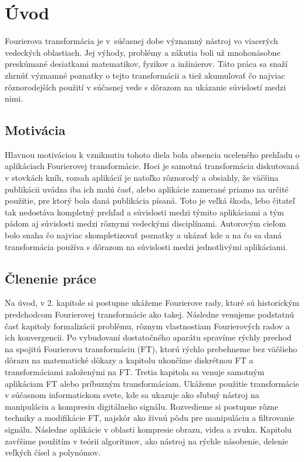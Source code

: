 \chapter{Úvod}

Fourierova transformácia je v~súčasnej dobe významný nástroj vo
viacerých vedeckých oblastiach. Jej výhody, problémy a zákutia boli už
mnohonásobne preskúmané desiatkami matematikov, fyzikov a inžinierov.
Táto práca sa snaží zhrnúť významné poznatky o tejto transformácii a
tiež akumulovať čo najviac rôznorodejších použití v súčasnej vede
s dôrazom na ukázanie súvislostí medzi nimi.

\section{Motivácia}
Hlavnou motiváciou k vzniknutiu tohoto diela bola absencia uceleného
prehľadu o aplikáciach Fourierovej transformácie. Hoci je samotná
transformácia diskutovaná v stovkách kníh, rozsah aplikácií je natoľko
rôznorodý a obsiahly, že väčšina publikácii uvádza iba ich malú časť,
alebo aplikácie zamerané priamo na určité použitie, pre ktorý bola daná
publikácia písaná. Toto je veľká škoda, lebo čitateľ tak nedostáva
kompletný prehľad a súvislosti medzi týmito aplikáciami a tým
pádom aj súvislosti medzi rôznymi vedeckými disciplínami. Autorovým
cieľom bolo snaha čo najviac skompletizovať poznatky a ukázať kde a
na čo sa daná transformácia používa s dôrazom na súvislosti medzi
jednotlivými aplikáciami.

\section{Členenie práce}
Na úvod, v 2. kapitole si postupne ukážeme Fourierove rady, ktoré sú
historickým predchodcom Fourierovej transformácie ako takej. Následne
venujeme podstatnú časť kapitoly formalizácii problému, rôznym
vlastnostiam Fourierových radov a ich konvergencii. Po vybudovaní
dostatočného aparátu spravíme rýchly prechod na spojitú Fourierovu
transformáciu (FT), ktorú rýchlo prebehneme bez väčšieho dôrazu na
matematické dôkazy a kapitolu ukončíme diskrétnou FT a 
transformáciami založenými na FT.
Tretia kapitola sa venuje samotným aplikáciam FT alebo príbuzným
transformáciam.  Ukážeme použitie %
transformácie v súčasnom informatickom svete, kde sa ukazuje ako
sľubný nástroj na manipuláciu a kompresiu digitálneho signálu.
Rozvedieme si postupne rôzne techniky a modifikácie FT, najskôr ako
živnú pôdu pre manipuláciu a filtrovanie signálu. Následne aplikácie v
oblasti kompresie obrazu, videa a zvuku. Kapitolu zavŕšime použitím v
teórii algoritmov, ako nástroj na rýchle násobenie, delenie veľkých
čísel a polynómov.
